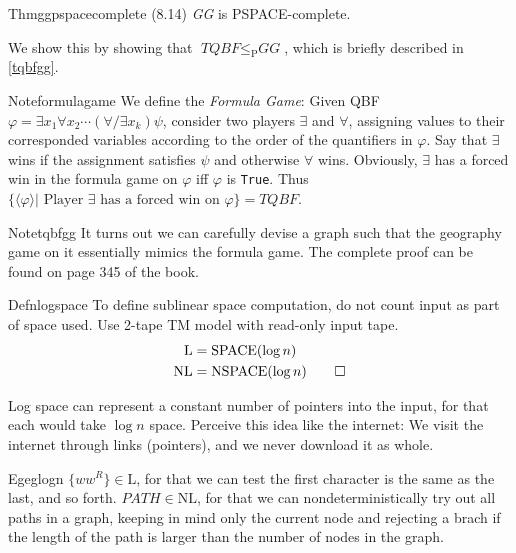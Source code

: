 \begin{reference}{Thm}{ggpspacecomplete}
  (8.14) \textit{GG} is PSPACE-complete.
\end{reference}

We show this by showing that $\textit{TQBF}\leq_{\mathrm{P}}\textit{GG}$, which is briefly described in \ref{tqbfgg}.

\begin{reference}{Note}{formulagame}
  We define the \emph{Formula Game}: Given QBF $\varphi=\exists x_1\forall x_2\cdots(\forall/\exists x_k)\psi$, consider two players $\exists$ and $\forall$, assigning values to their corresponded variables according to the order of the quantifiers in $\varphi$. Say that $\exists$ wins if the assignment satisfies $\psi$ and otherwise $\forall$ wins. Obviously, $\exists$ has a forced win in the formula game on $\varphi$ iff $\varphi$ is \texttt{True}. Thus $\{\langle \varphi\rangle|\text{ Player }\exists\text{ has a forced win on }\varphi\}=\textit{TQBF}$.
\end{reference}

\begin{reference}{Note}{tqbfgg}
  It turns out we can carefully devise a graph such that the geography game on it essentially mimics the formula game. The complete proof can be found on page 345 of the book.
\end{reference}

\begin{reference}{Defn}{logspace}
  To define sublinear space computation, do not count input as part of space used. Use 2-tape TM model with read-only input tape.
  \begin{align*}
    \mathrm{L}  & =\mathrm{SPACE}(\log n)          \\
    \mathrm{NL} & =\mathrm{NSPACE}(\log n)\qedhere
  \end{align*}
\end{reference}

Log space can represent a constant number of pointers into the input, for that each would take $\log n$ space. Perceive this idea like the internet: We visit the internet through links (pointers), and we never download it as whole.

\begin{reference}{Eg}{eglogn}
  $\{ww^R\}\in \mathrm{L}$, for that we can test the first character is the same as the last, and so forth. $\textit{PATH}\in \mathrm{NL}$, for that we can nondeterministically try out all paths in a graph, keeping in mind only the current node and rejecting a brach if the length of the path is larger than the number of nodes in the graph.
\end{reference}

